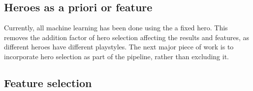 \documentclass{../sty/SizheArticle}
\begin{document}
\subsection{Heroes as a priori or feature}
Currently, all machine learning has been done using the a fixed hero. This removes the addition factor of hero selection affecting the results and features, as different heroes have different playstyles. The next major piece of work is to incorporate hero selection as part of the pipeline, rather than excluding it. 

\subsection{Feature selection}


\printbibliography
\end{document}
